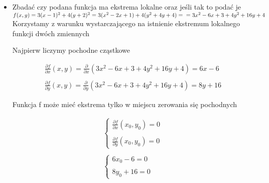 \documentclass[main.tex]{subfiles}
\begin{document}
    \begin{itemize}
        \item Zbadać czy podana funkcja ma ekstrema lokalne oraz jeśli tak to podać je\\

        $f(x,y) = 3(x-1)^2 + 4(y+2)^2 = 3(x^2 - 2x +1) + 4(y^2 + 4y + 4) =\\ = 3x^2 - 6x + 3 + 4y^2 + 16y + 4$\\

        Korzystamy z warunku wystarczającego na istnienie ekstremum lokalnego funkcji dwóch zmiennych

        Najpierw liczymy pochodne cząstkowe

        \begin{equation}
            \begin{aligned}
                \frac{\partial f}{\partial x} (x,y) = \frac{\partial }{\partial x} \left( 3x^2 - 6x + 3 + 4y^2 + 16y + 4 \right) = 6x - 6 \\
                \\
                \frac{\partial f}{\partial y} (x,y) = \frac{\partial }{\partial y} \left( 3x^2 - 6x + 3 + 4y^2 + 16y + 4 \right) = 8y + 16
            \end{aligned}
        \end{equation}

        Funkcja f może mieć ekstrema tylko w miejscu zerowania się pochodnych

        \begin{equation}
            \begin{aligned}
                \left \{ \begin{array}{lr}
                             \frac{\partial f}{\partial x} (x_0, y_0 ) = 0 \\
                             \\
                             \frac{\partial f}{\partial y} (x_0, y_0) = 0
                \end{array} \right.
                \\
                \\
                \left \{ \begin{array}{lr}
                             6x_0 - 6 = 0 \\
                             \\
                             8y_0 + 16 = 0
                \end{array}\right.
            \end{aligned}
        \end{equation}


\end{itemize}
\end{document}
